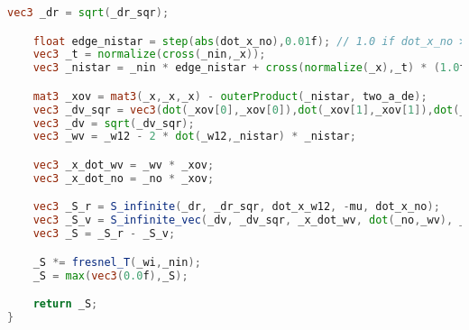 \begin{lstlisting}[language=GLSL,label=lst:l,caption={Directional dipole code optimized for GPU. Uniforms and Fresnel formulas code is not reported.}]
    vec3 _dr = sqrt(_dr_sqr);

    float edge_nistar = step(abs(dot_x_no),0.01f); // 1.0 if dot_x_no > 0.01
    vec3 _t = normalize(cross(_nin,_x));
    vec3 _nistar = _nin * edge_nistar + cross(normalize(_x),_t) * (1.0f - edge_nistar);

    mat3 _xov = mat3(_x,_x,_x) - outerProduct(_nistar, two_a_de);
    vec3 _dv_sqr = vec3(dot(_xov[0],_xov[0]),dot(_xov[1],_xov[1]),dot(_xov[2],_xov[2]));
    vec3 _dv = sqrt(_dv_sqr);
    vec3 _wv = _w12 - 2 * dot(_w12,_nistar) * _nistar;

    vec3 _x_dot_wv = _wv * _xov;
    vec3 _x_dot_no = _no * _xov;

    vec3 _S_r = S_infinite(_dr, _dr_sqr, dot_x_w12, -mu, dot_x_no);
    vec3 _S_v = S_infinite_vec(_dv, _dv_sqr, _x_dot_wv, dot(_no,_wv), _x_dot_no);
    vec3 _S = _S_r - _S_v;

    _S *= fresnel_T(_wi,_nin);
    _S = max(vec3(0.0f),_S);

    return _S;
}
\end{lstlisting}


